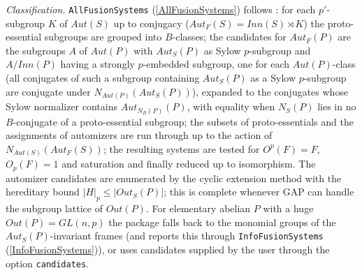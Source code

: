 \documentclass[a4paper,11pt]{report}
\begin{document}
{{ \emph{Classification.} \texttt{AllFusionSystems} (\ref{AllFusionSystems}) follows \cite[Section 4]{PS21}: for each $p'$-subgroup $K$ of $Aut(S)$ up to conjugacy ($Aut_F(S) = Inn(S) \rtimes K$) the proto-essential subgroups are grouped into $B$-classes; the candidates for $Aut_F(P)$ are the subgroups $A$ of $Aut(P)$ with $Aut_S(P)$ as Sylow $p$-subgroup and $A/Inn(P)$ having a strongly $p$-embedded subgroup, one for each $Aut(P)$-class (all conjugates of such a subgroup containing $Aut_S(P)$ as a Sylow $p$-subgroup are conjugate under $N_{Aut(P)}(Aut_S(P))$), expanded to the conjugates whose Sylow normalizer contains $Aut_{N_B(P)}(P)$, with equality when $N_S(P)$ lies in no $B$-conjugate of a proto-essential subgroup; the subsets of proto-essentials and
the assignments of automizers are run through up to the action of $N_{Aut(S)}(Aut_F(S))$; the resulting systems are tested for $O^p(F)=F$, $O_p(F)=1$ and saturation and finally reduced up to isomorphism. The automizer candidates
are enumerated by the cyclic extension method with the hereditary bound $|H|_p \le |Out_S(P)|$; this is complete whenever GAP can handle the subgroup lattice of $Out(P)$. For elementary abelian $P$ with a huge $Out(P) = GL(n,p)$ the package falls back to the monomial groups of the $Aut_S(P)$-invariant frames (and reports this through \texttt{InfoFusionSystems} (\ref{InfoFusionSystems})), or uses candidates supplied by the user through the option \texttt{candidates}. }

 }

 
\end{document}
